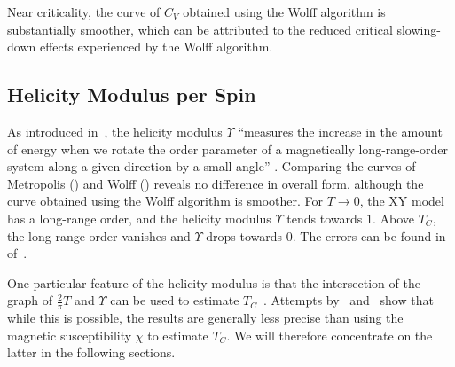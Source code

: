 		Near criticality, the curve of $C_V$ obtained using the Wolff algorithm is substantially smoother, which can be attributed to the reduced critical slowing-down effects experienced by the Wolff algorithm.
	
	\subsection{Helicity Modulus per Spin}\label{sec:res:helicity:observable}
		As introduced in~, the helicity modulus $\Upsilon$ \enquote{measures the increase in the amount of energy when we rotate the order parameter of a magnetically long-range-order system along a given direction by a small angle} \citep[p. 1]{krueger}. Comparing the curves of Metropolis () and Wolff () reveals no difference in overall form, although the curve obtained using the Wolff algorithm is smoother. For $T \rightarrow 0$, the XY model has a long-range order, and the helicity modulus $\Upsilon$ tends towards $1$. Above $T_C$, the long-range order vanishes and $\Upsilon$ drops towards $0$. The errors can be found in~ of~.
		
		One particular feature of the helicity modulus is that the intersection of the graph of $\frac{2}{\pi} T$ and $\Upsilon$ can be used to estimate $T_C$~\citep{teitel_helicity}. Attempts by~\cite{teitel_helicity} and~\cite{olsson_helicity} show that while this is possible, the results are generally less precise than using the magnetic susceptibility $\chi$ to estimate $T_C$. We will therefore concentrate on the latter in the following sections.

	